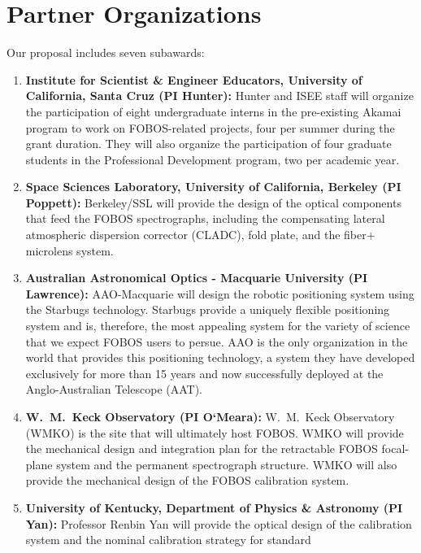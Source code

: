 \documentclass[oneside,11pt]{amsart}
\begin{document}


\vspace*{-1.5cm}

\section*{Partner Organizations}

\noindent Our proposal includes seven subawards:
%
\begin{enumerate}
%
\item {\bf Institute for Scientist \& Engineer Educators, University of
California, Santa Cruz (PI Hunter):} Hunter and ISEE staff will organize
the participation of eight undergraduate interns in the pre-existing
Akamai program to work on FOBOS-related projects, four per summer during
the grant duration. They will also organize the participation of four
graduate students in the Professional Development program, two per
academic year.
%
\item {\bf Space Sciences Laboratory, University of California, Berkeley
(PI Poppett):} Berkeley/SSL will provide the design of the optical
components that feed the FOBOS spectrographs, including the compensating
lateral atmospheric dispersion corrector (CLADC), fold plate, and the
fiber$+$microlens system.
%
\item {\bf Australian Astronomical Optics - Macquarie University (PI
Lawrence):} AAO-Macquarie will design the robotic positioning system
using the Starbugs technology.  Starbugs provide a uniquely flexible
positioning system and is, therefore, the most appealing system for the
variety of science that we expect FOBOS users to persue.  AAO is the
only organization in the world that provides this positioning
technology, a system they have developed exclusively for more than 15
years and now successfully deployed at the Anglo-Australian Telescope
(AAT).
%
\item {\bf W.~M.~Keck Observatory (PI O`Meara):} W.~M.~Keck Observatory
(WMKO) is the site that will ultimately host FOBOS. WMKO will provide
the mechanical design and integration plan for the retractable FOBOS
focal-plane system and the permanent spectrograph structure. WMKO will
also provide the mechanical design of the FOBOS calibration system.
%
\item {\bf University of Kentucky, Department of Physics \& Astronomy
(PI Yan):} Professor Renbin Yan will provide the optical design of the
calibration system and the nominal calibration strategy for standard

\end{enumerate}
\end{document}
